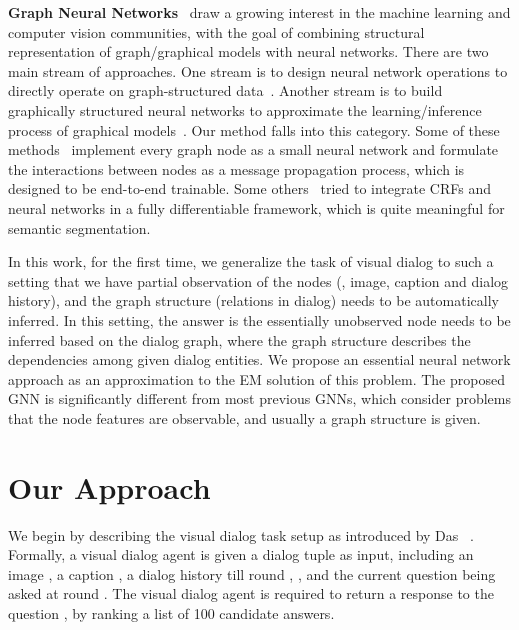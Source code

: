 \documentclass[10pt,twocolumn,letterpaper]{article}
\begin{document}
\noindent\textbf{Graph Neural Networks}~\cite{gori2005new,scarselli2009graph} draw a growing interest in the machine learning and computer vision communities, with the goal of combining structural representation of graph/graphical models with neural networks. There are two main stream of approaches. One stream is to design neural network operations to directly operate on graph-structured data~\cite{duvenaud2015convolutional,niepert2016learning,monti2016geometric,simonovsky2017dynamic,defferrard2016convolutional,kipf2017semi}. Another stream is to build graphically structured neural networks to approximate the learning/inference process of graphical models~\cite{lin2015deeply,sukhbaatar2016learning,li2016gated,fang2018learning,battaglia2016interaction,gilmer2017neural,wang2018attentive,chu2016crf}. Our method falls into this category. Some of these methods~\cite{lin2015deeply,sukhbaatar2016learning,battaglia2016interaction,gilmer2017neural,kipf2018neural,Qi_2018_ECCV} implement every graph node as a small neural network and formulate the interactions between nodes as a message propagation process, which is designed to be end-to-end trainable. Some others~\cite{zheng2015conditional,lin2015deeply,liu2015semantic,lin2016efficient,chu2016crf} tried to integrate CRFs and neural networks in a fully differentiable framework, which is quite meaningful for semantic segmentation. 

In this work, for the first time, we generalize the task of visual dialog to such a setting that we have partial observation of the nodes (\ie, image, caption and dialog history), and the graph structure (relations in dialog) needs to be automatically inferred. In this setting, the answer is the essentially unobserved node needs to be inferred based on the dialog graph, where the graph structure describes the dependencies among given dialog entities. We propose an essential neural network approach as an approximation to the EM solution of this problem. The proposed GNN is significantly different from most previous GNNs, which consider problems that the node features are observable, and usually a graph structure is given.


\vspace{-3pt}
\section{Our Approach}\label{sec:oa}
\vspace{-3pt}


We begin by describing the visual dialog task setup as introduced by Das \etal~\cite{das2017visual}. Formally, a visual dialog agent is given a dialog tuple  as input, including an image , a caption , a dialog history till round , , and the current question  being asked at round . The visual dialog agent is required to return a response  to the question , by ranking a list of 100 candidate answers.
\end{document}
